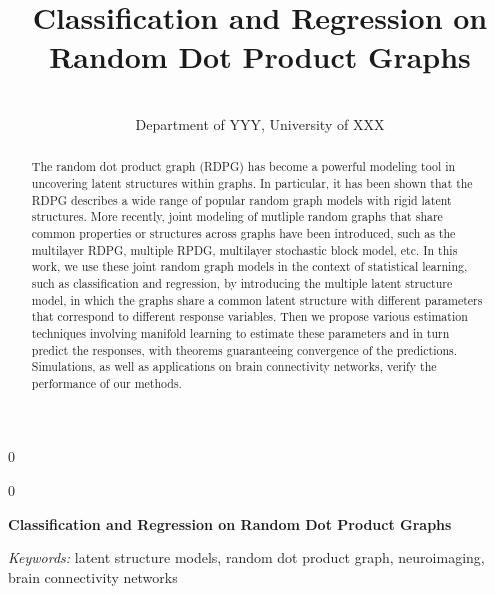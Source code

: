 \documentclass[12pt]{article}
\newcommand{\blind}{0}
\begin{document}
\def\spacingset#1{\renewcommand{\baselinestretch}%
{#1}\small\normalsize} \spacingset{1}



\blind
{
  \title{\bf Classification and Regression on Random Dot Product Graphs}

  \author{
         \\
    Department of YYY, University of XXX\\
      }
  \maketitle
} \fi

\blind
{
  \bigskip
  \bigskip
  \bigskip
  \begin{center}
    {\LARGE\bf Classification and Regression on Random Dot Product
Graphs}
  \end{center}
  \medskip
} \fi

\bigskip
\begin{abstract}
The random dot product graph (RDPG) has become a powerful modeling tool
in uncovering latent structures within graphs. In particular, it has
been shown that the RDPG describes a wide range of popular random graph
models with rigid latent structures. More recently, joint modeling of
mutliple random graphs that share common properties or structures across
graphs have been introduced, such as the multilayer RDPG, multiple RPDG,
multilayer stochastic block model, etc. In this work, we use these joint
random graph models in the context of statistical learning, such as
classification and regression, by introducing the multiple latent
structure model, in which the graphs share a common latent structure
with different parameters that correspond to different response
variables. Then we propose various estimation techniques involving
manifold learning to estimate these parameters and in turn predict the
responses, with theorems guaranteeing convergence of the predictions.
Simulations, as well as applications on brain connectivity networks,
verify the performance of our methods.
\end{abstract}

\noindent%
{\it Keywords:} latent structure models, random dot product
graph, neuroimaging, brain connectivity networks

\vfill

\newpage
\spacingset{1.9} %
\end{document}
